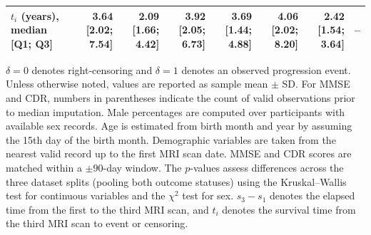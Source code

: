 \begin{landscape}
\begin{table}[p]
\begin{tabular}{@{}lrrrrrrr@{}}
$t_i$ (years), median [Q1; Q3] & 3.64 [2.02; 7.54] & 2.09 [1.66; 4.42] & 3.92 [2.05; 6.73] & 3.69 [1.44; 4.88] & 4.06 [2.02; 8.20] & 2.42 [1.54; 3.64] & -- \\
\bottomrule
\end{tabular}
\par\vspace{6pt}
\begin{minipage}{0.96\linewidth}\small
$\delta=0$ denotes right-censoring and $\delta=1$ denotes an observed progression event. Unless otherwise noted, values are reported as sample mean $\pm$ SD. For MMSE and CDR, numbers in parentheses indicate the count of valid observations prior to median imputation. Male percentages are computed over participants with available sex records. Age is estimated from birth month and year by assuming the 15th day of the birth month. Demographic variables are taken from the nearest valid record up to the first MRI scan date. MMSE and CDR scores are matched within a $\pm90$-day window. The $p$-values assess differences across the three dataset splits (pooling both outcome statuses) using the Kruskal--Wallis test for continuous variables and the $\chi^2$ test for sex. $s_3-s_1$ denotes the elapsed time from the first to the third MRI scan, and $t_i$ denotes the survival time from the third MRI scan to event or censoring.
\end{minipage}
\end{table}
\end{landscape}
